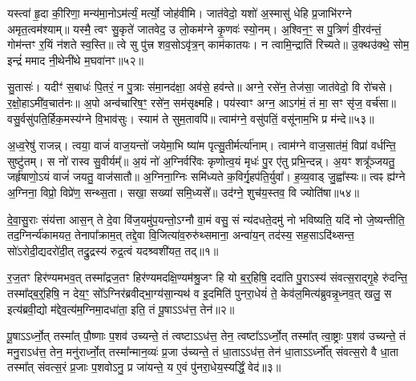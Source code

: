 {\anuvakamend[{दमे॑दम॒ ओष॑धय॒ आ षट् च॑॥45 (39)॥}]}

यस्त्वा॑ हृ॒दा की॒रिणा॒ मन्य॑मा॒नो\-ऽम॑र्त्यं॒ मर्त्यो॒ जोह॑वीमि। जात॑वेदो॒ यशो॑ अ॒स्मासु॑ धेहि प्र॒जाभि॑रग्ने अमृत॒त्वम॑श्याम्॥ यस्मै॒ त्वꣳ सु॒कृते॑ जातवेद॒ उ लो॒कम॑ग्ने कृ॒णवः॑ स्यो॒नम्। अ॒श्विन॒ꣳ॒ स पु॒त्रिणं॑ वी॒रव॑न्तं॒ गोम॑न्तꣳ र॒यिं न॑शते स्व॒स्ति॥ त्वे सु पु॑त्त्र शव॒सो\-ऽवृ॑त्र॒न् काम॑कातयः। न त्वामि॒न्द्राति॑ रिच्यते॥ उ॒क्थउ॑क्थे॒ सोम॒ इन्द्रं॑ ममाद नी॒थेनी॑थे म॒घवा॑नꣳ॥५२॥

सु॒तासः॑। यदीꣳ॑ स॒बाधः॑ पि॒तरं॒ न पु॒त्राः स॑मा॒नद॑क्षा॒ अव॑से॒ हव॑न्ते॥ अग्ने॒ रसे॑न॒ तेज॑सा॒ जात॑वेदो॒ वि रो॑चसे। र॒क्षो॒हा\-ऽमी॑व॒चात॑नः॥ अ॒पो अन्व॑चारिष॒ꣳ॒ रसे॑न॒ सम॑सृक्ष्महि। पय॑स्वाꣳ अग्न॒ आ\-ऽग॑मं॒ तं मा॒ सꣳ सृ॑ज॒ वर्च॑सा॥ वसु॒र्वसु॑पति॒र्\mbox{}हिक॒मस्य॑ग्ने वि॒भाव॑सुः। स्याम॑ ते सुम॒तावपि॑॥ त्वाम॑ग्ने॒ वसु॑पतिं॒ वसू॑नाम॒भि प्र म॑न्दे॥५३॥

अ॒ध्व॒रेषु॑ राजन्न्। त्वया॒ वाजं॑ वाज॒यन्तो॑ जयेमा॒भि ष्या॑म पृत्सु॒तीर्मर्त्या॑नाम्। त्वाम॑ग्ने वाज॒सात॑मं॒ विप्रा॑ वर्धन्ति॒ सुष्टु॑तम्। स नो॑ रास्व सु॒वीर्यम्᳚॥ अ॒यं नो॑ अ॒ग्निर्वरि॑वः कृणोत्व॒यं मृधः॑ पु॒र ए॑तु प्रभि॒न्दन्न्। अ॒यꣳ शत्रू᳚ञ्जयतु॒ जर्\mbox{}हृ॑षाणो॒\-ऽयं वाजं॑ जयतु॒ वाज॑सातौ॥ अ॒ग्निना॒ग्निः समि॑ध्यते क॒विर्गृ॒हप॑ति॒र्युवा᳚। ह॒व्य॒वाड् जु॒ह्वा᳚स्यः॥ त्वꣴ ह्य॑ग्ने अ॒ग्निना॒ विप्रो॒ विप्रे॑ण॒ सन्थ्स॒ता। सखा॒ सख्या॑ समि॒ध्यसे᳚॥ उद॑ग्ने॒ शुच॑य॒स्तव॒ वि ज्योति॑षा॥५४॥

{\anuvakamend[{म॒घवा॑नं मन्दे॒ ह्य॑ग्ने॒ चतु॑र्दश च॥46॥}]}

\setcounter{anuvakam}{0}
दे॒वा॒सु॒राः संय॑त्ता आस॒न् ते दे॒वा वि॑ज॒यमु॑प॒यन्तो॒\-ऽग्नौ वा॒मं वसु॒ सं न्य॑दधते॒दमु॑ नो भविष्यति॒ यदि॑ नो जे॒ष्यन्तीति॒ तद॒ग्निर्न्य॑कामयत॒ तेनापा᳚क्राम॒त् तद्दे॒वा वि॒जित्या॑व॒रुरु॑थ्समाना॒ अन्वा॑य॒न् तद॑स्य॒ सह॒सा\-ऽदि॑थ्सन्त॒ सो॑\-ऽरोदी॒द्यदरो॑दी॒त् तद्रु॒द्रस्य॑ रुद्र॒त्वं यदश्र्वशी॑यत॒ तद्॥१॥

र॒ज॒तꣳ हिर॑ण्यमभव॒त् तस्मा᳚द्रज॒तꣳ हिर॑ण्यमदक्षि॒ण्यम॑श्रु॒जꣳ हि यो ब॒र्॒\mbox{}हिषि॒ ददा॑ति पु॒रा\-ऽस्य॑ संवत्स॒राद्गृ॒हे रु॑दन्ति॒ तस्मा᳚द्ब॒र्॒\mbox{}हिषि॒ न देय॒ꣳ॒ सो᳚\-ऽग्निर॑ब्रवीद्भा॒ग्य॑सा॒न्यथ॑ व इ॒दमिति॑ पुनरा॒धेयं॑ ते॒ केव॑ल॒मित्य॑ब्रुवन्नृ॒ध्नव॒त् खलु॒ स इत्य॑ब्रवी॒द्यो म॑द्देव॒त्य॑म॒ग्निमा॒दधा॑ता॒ इति॒ तं पू॒षा\-ऽ\-ऽध॑त्त॒ तेन॑॥२॥

पू॒षा\-ऽ\-ऽर्ध्नो॒त् तस्मा᳚त् पौ॒ष्णाः प॒शव॑ उच्यन्ते॒ तं त्वष्टा\-ऽ\-ऽध॑त्त॒ तेन॒ त्वष्टा᳚\-ऽ\-ऽर्ध्नो॒त् तस्मा᳚त् त्वा॒ष्ट्राः प॒शव॑ उच्यन्ते॒ तं मनु॒रा\-ऽध॑त्त॒ तेन॒ मनु॑रार्ध्नो॒त् तस्मा᳚न्मान॒व्यः॑ प्र॒जा उ॑च्यन्ते॒ तं धा॒ता\-ऽ\-ऽध॑त्त॒ तेन॑ धा॒ता\-ऽ\-ऽर्ध्नो᳚त् संवत्स॒रो वै धा॒ता तस्मा᳚त् संवत्स॒रं प्र॒जाः प॒शवो\-ऽनु॒ प्र जा॑यन्ते॒ य ए॒वं पु॑नरा॒धेय॒स्यर्द्धिं॒ वेद॑॥३॥

